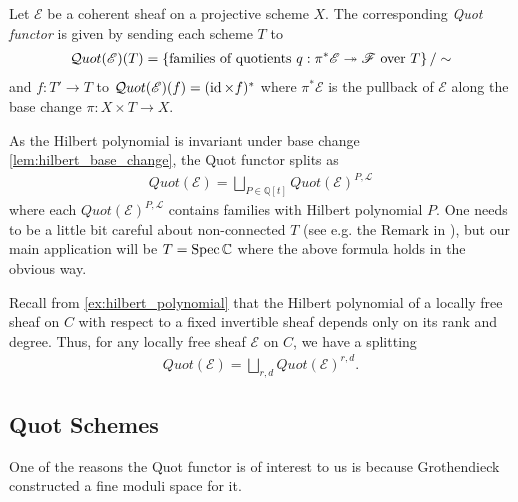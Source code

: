 \documentclass[12pt]{ociamthesis}  %
\begin{document}
\begin{definition}
  Let $\mathscr E$ be a coherent sheaf on a projective scheme $X$.
  The corresponding \emph{Quot functor} is given by sending each
  scheme $T$ to
  \begin{align*}
    \mathcal Quot (\mathscr E)(T) = \left\lbrace{
      \text{families of quotients $q : \pi^*\mathscr E \twoheadrightarrow \mathscr F$
        over $T$}
    }\right\rbrace / \sim
  \end{align*}
  and $f : T' \to T$ to
  $\mathcal Quot(\mathscr E)(f) = (\operatorname{id} \times f)^*$ where
  $\pi^*\mathscr E$ is the pullback of $\mathscr E$ along
  the base change $\pi:X\times T\to X$.
\end{definition}

As the Hilbert polynomial is invariant under base change
\ref{lem:hilbert_base_change}, the Quot functor splits as
\begin{align*}
  Quot(\mathscr E)
  = \bigsqcup_{P\in\mathbb{Q}[t]} Quot(\mathscr E)^{P,\mathscr L}
\end{align*}
where each $Quot(\mathscr E)^{P,\mathscr L}$ contains families
with Hilbert polynomial $P$. One needs to be a little bit careful
about non-connected $T$ (see e.g. the Remark in \cite[5-6]{siddharth2016}), but our main application will be
$T = \operatorname{Spec}\mathbb C$ where the above formula holds in the obvious way.

\begin{example}
  Recall from \ref{ex:hilbert_polynomial} that the Hilbert polynomial of a
  locally free sheaf on $C$ with respect to a fixed invertible sheaf depends
  only on its rank and degree.  Thus, for any locally free sheaf $\mathscr E$ on
  $C$, we have a splitting
  \begin{align}\label{eq:quot_functor_split_on_c}
    Quot(\mathscr E) = \bigsqcup_{r,d} Quot(\mathscr E)^{r,d}.
  \end{align}
  \missingexample
\end{example}

\subsection{Quot Schemes}

One of the reasons the Quot functor is of interest to us is because
Grothendieck constructed a fine moduli space for it. \missingcitation
\end{document}
